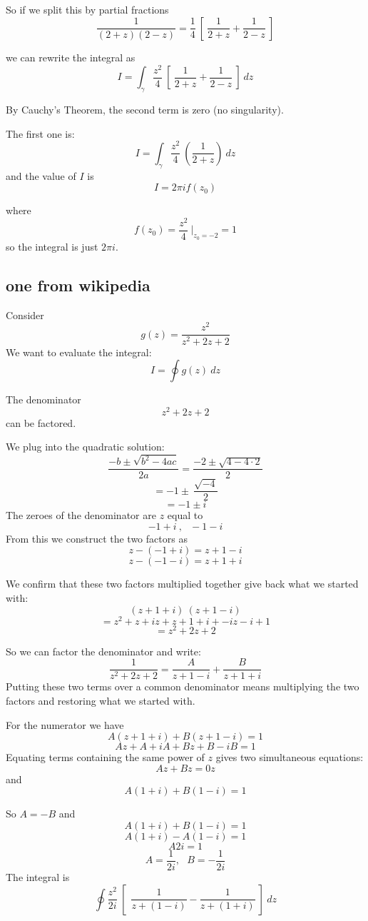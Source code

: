 \documentclass[11pt, oneside]{article}
\begin{document}
So if we split this by partial fractions
\[  \frac{1}{(2+z)(2-z)} = \frac{1}{4} \ [ \ \frac{1}{2+z} + \frac{1}{2-z} \ ] \]

we can rewrite the integral as
\[ I = \int_{\gamma} \frac{z^2}{4} \ [ \ \frac{1}{2+z} + \frac{1}{2-z} \ ] \ dz \]

By Cauchy's Theorem, the second term is zero (no singularity).

The first one is:
\[ I = \int_{\gamma} \frac{z^2}{4} \ ( \frac{1}{2+z} ) \ dz \]
and the value of $I$ is
\[ I = 2 \pi i f(z_0) \]

where 
\[ f(z_0) = \frac{z^2}{4}  \ \bigg |_{z_0 = -2} = 1 \]
so the integral is just $2 \pi i$.

\subsection*{one from wikipedia}
Consider
\[ g(z) = \frac{z^2}{z^2 + 2z + 2} \]
We want to evaluate the integral:
\[ I = \oint g(z) \ dz \]

The denominator
\[ z^2 + 2z + 2 \]
can be factored.

We plug into the quadratic solution:
\[ \frac{-b \pm \sqrt{b^2 - 4ac}}{2a} =  \frac{-2 \pm \sqrt{4 - 4 \cdot 2}}{2} \]
\[ = -1 \pm \  \frac{\sqrt{-4}}{2} \]
\[ = -1 \pm i \]
The zeroes of the denominator are $z$ equal to 
\[ - 1 + i \ , \ \ \ - 1 - i \]
From this we construct the two factors as
\[ z - (- 1 + i) = z + 1 - i \]
\[ z - (-1 - i) = z + 1 + i \]

We confirm that these two factors multiplied together give back what we started with:
\[ (z + 1 + i) \ (z + 1 - i) \]
\[ = z^2 + z + iz + z + 1 + i + -iz - i + 1 \] 
\[ = z^2 + 2z + 2 \]

So we can factor the denominator and write:
\[ \frac{1}{z^2 + 2z + 2} = \frac{A}{z + 1 - i} + \frac{B}{z + 1 + i}  \]
Putting these two terms over a common denominator means multiplying the two factors and restoring what we started with.

For the numerator we have
\[ A(z + 1 + i) + B(z + 1 - i) = 1 \]
\[ Az + A + iA + Bz + B - iB = 1 \]
Equating terms containing the same power of $z$ gives two simultaneous equations:
\[ Az + Bz = 0z \]
and
\[ A(1 + i) + B(1 - i) = 1 \]

So $A = -B$ and
\[ A(1 + i) + B(1 - i) = 1 \]
\[ A (1 + i) - A(1 - i) = 1 \]
\[ A 2i = 1 \]
\[ A = \frac{1}{2i}, \ \ \ B = -\frac{1}{2i} \]
The integral is
\[ \oint \frac{z^2}{2i} \ [ \ \ \frac{1}{z + (1 - i)} -  \frac{1}{z + (1 + i)} \ ] \ dz \]
\end{document}
